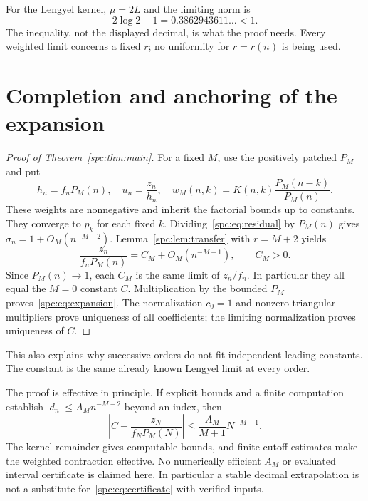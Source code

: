 \documentclass[11pt,letterpaper]{article}
\theoremstyle{definition}\newtheorem{definition}[theorem]{Definition}
\theoremstyle{remark}\newtheorem{remark}[theorem]{Remark}
\begin{document}
For the Lengyel kernel, $\mu=2L$ and the limiting norm is
\[
 2\log2-1=0.3862943611\ldots<1.
\]
The inequality, not the displayed decimal, is what the proof needs. Every weighted limit concerns a fixed $r$; no uniformity for $r=r(n)$ is being used.

\section{Completion and anchoring of the expansion}\label{spc:sec:completion}
\begin{proof}[Proof of Theorem~\ref{spc:thm:main}]
For a fixed $M$, use the positively patched $P_M$ and put
\[
 h_n=f_nP_M(n),\quad u_n=\frac{z_n}{h_n},\quad
 w_M(n,k)=K(n,k)\frac{P_M(n-k)}{P_M(n)}.
\]
These weights are nonnegative and inherit the factorial bounds up to constants. They converge to $p_k$ for each fixed $k$. Dividing~\eqref{spc:eq:residual} by $P_M(n)$ gives
$\sigma_n=1+O_M(n^{-M-2})$.
Lemma~\ref{spc:lem:transfer} with $r=M+2$ yields
\[
 \frac{z_n}{f_nP_M(n)}=C_M+O_M(n^{-M-1}),\qquad C_M>0.
\]
Since $P_M(n)\to1$, each $C_M$ is the same limit of $z_n/f_n$. In particular they all equal the $M=0$ constant $C$. Multiplication by the bounded $P_M$ proves~\eqref{spc:eq:expansion}. The normalization $c_0=1$ and nonzero triangular multipliers prove uniqueness of all coefficients; the limiting normalization proves uniqueness of $C$.
\end{proof}
This also explains why successive orders do not fit independent leading constants. The constant is the same already known Lengyel limit at every order.

The proof is effective in principle. If explicit bounds and a finite computation establish $|d_n|\le A_Mn^{-M-2}$ beyond an index, then
\begin{equation}\label{spc:eq:certificate}
 \left|C-\frac{z_N}{f_NP_M(N)}\right|
 \le\frac{A_M}{M+1}N^{-M-1}.
\end{equation}
The kernel remainder gives computable bounds, and finite-cutoff estimates make the weighted contraction effective. No numerically efficient $A_M$ or evaluated interval certificate is claimed here. In particular a stable decimal extrapolation is not a substitute for~\eqref{spc:eq:certificate} with verified inputs.
\end{document}
